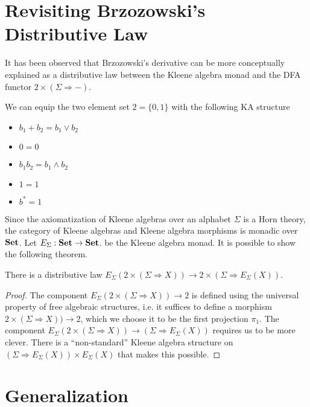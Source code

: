 \documentclass[acmsmall,anonymous,review,screen]{acmart}
\newcommand{\cat}[1]{
  \relax
  \StrLen{#1}[\arglength]
  \ifnum\arglength=1
  \mathcal{#1}
  \else
  \mathbf{#1}
  \fi
}
\newcommand{\Set}{\cat{Set}}
\begin{document}
\section{Revisiting Brzozowski's Distributive Law}

It has been observed that Brzozowski's derivative can be more conceptually
explained as a distributive law between the Kleene algebra monad and the
DFA functor $2 \times (\Sigma \Rightarrow -)$.

\begin{definition}
  We can equip the two element set $2 = \{0, 1 \}$ with the following KA structure
  \begin{itemize}
    \item $b_1 + b_2 = b_1 \lor b_2$
    \item $0 = 0$
    \item $b_1 b_2 = b_1 \land b_2$
    \item $1 = 1$
    \item $b^* = 1$
  \end{itemize}
\end{definition}

Since the axiomatization of Kleene algebras over an alphabet $\Sigma$
is a Horn theory, the category of Kleene algebras and Kleene algebra
morphisms is monadic over $\Set$. Let $E_\Sigma : \Set \to \Set$. be the 
Kleene algebra monad. It is possible to show the following theorem.

\begin{theorem}
  There is a distributive law $E_\Sigma(2 \times (\Sigma \Rightarrow X)) \to 2 \times (\Sigma \Rightarrow E_\Sigma(X))$.
\end{theorem}
\begin{proof}
  The component $E_\Sigma(2 \times (\Sigma \Rightarrow X)) \to 2$ is
  defined using the universal property of free algebraic structures,
  i.e. it suffices to define a morphism $2 \times (\Sigma \Rightarrow
  X)) \to 2$, which we choose it to be the first projection
  $\pi_1$. The component $E_\Sigma(2 \times (\Sigma \Rightarrow X))
  \to (\Sigma \Rightarrow E_\Sigma(X))$ requires us to be more
  clever. There is a ``non-standard'' Kleene algebra structure on
  $(\Sigma \Rightarrow E_\Sigma(X)) \times E_\Sigma(X)$ that makes
  this possible.
\end{proof}

\section{Generalization}
\end{document}
